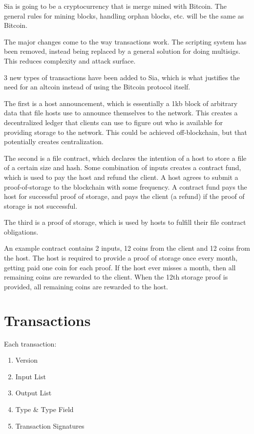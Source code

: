 \documentclass[twocolumn]{article}
\begin{document}
Sia is going to be a cryptocurrency that is merge mined with Bitcoin.
The general rules for mining blocks, handling orphan blocks, etc. will be the same as Bitcoin.

The major changes come to the way transactions work.
The scripting system has been removed, instead being replaced by a general solution for doing multisigs.
This reduces complexity and attack surface.

3 new types of transactions have been added to Sia, which is what justifies the need for an altcoin instead of using the Bitcoin protocol itself.

The first is a host announcement, which is essentially a 1kb block of arbitrary data that file hosts use to announce themselves to the network.
This creates a decentralized ledger that clients can use to figure out who is available for providing storage to the network.
This could be achieved off-blockchain, but that potentially creates centralization.

The second is a file contract, which declares the intention of a host to store a file of a certain size and hash.
Some combination of inputs creates a contract fund, which is used to pay the host and refund the client.
A host agrees to submit a proof-of-storage to the blockchain with some frequency.
A contract fund pays the host for successful proof of storage, and pays the client (a refund) if the proof of storage is not successful.

The third is a proof of storage, which is used by hosts to fulfill their file contract obligations.

An example contract contains 2 inputs, 12 coins from the client and 12 coins from the host.
The host is required to provide a proof of storage once every month, getting paid one coin for each proof.
If the host ever misses a month, then all remaining coins are rewarded to the client.
When the 12th storage proof is provided, all remaining coins are rewarded to the host.

\section{Transactions}
Each transaction:
\begin{enumerate}
	\item Version
	\item Input List
	\item Output List
	\item Type \& Type Field
	\item Transaction Signatures
\end{enumerate}
\end{document}
